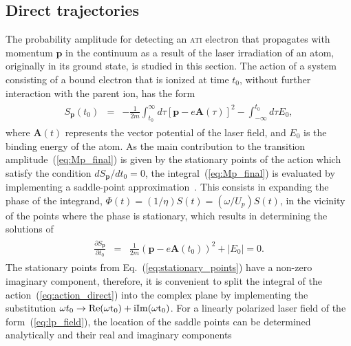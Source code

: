 
\subsection{\label{sec:spa_direct} Direct trajectories}

The probability amplitude for detecting an \textsc{ati} electron that
propagates with momentum $\mathbf{p}$ in the continuum as a result of
the laser irradiation of an atom, originally in its ground state, is
studied in this section. The action of a system consisting of a bound
electron that is ionized at time $t_{0}$, without further interaction
with the parent ion, has the form~\cite{phd_Kopold,Becker_ati2002}
%
\begin{eqnarray}
  \label{eq:action_direct}
  \begin{split}
  S_{\mathbf{p}}(t_{0}) & = &
-\frac{1}{2m}\int_{t_{0}}^{\infty}{d\tau [\mathbf{p} - e\mathbf{A}(\tau)]^{2}}
- \int_{-\infty}^{t_{0}}{d\tau E_{0}},
\end{split}
\end{eqnarray}
%
where $\mathbf{A}(t)$ represents the vector potential of the laser
field, and $E_{0}$ is the binding energy of the atom. As the main
contribution to the transition amplitude~(\ref{eq:Mp_final}) is given
by the stationary points of the action which satisfy the condition
$dS_{\mathbf{p}} / dt_{0} = 0$, the integral~(\ref{eq:Mp_final}) is
evaluated by implementing a saddle-point
approximation~\cite{spa_1960}. This consists in expanding the phase of
the integrand, $\Phi(t) = (1/\eta) S(t) = (\omega / U_{p}) S(t)$, in
the vicinity of the points where the phase is stationary, which
results in determining the solutions of
%
\begin{eqnarray}
  \label{eq:stationary_points}
  \begin{split}
    \frac{\partial S_{\mathbf{p}}}{\partial t_{0}} & = &
    \frac{1}{2m} (\mathbf{p} - e\mathbf{A}(t_{0}))^{2} + |E_{0}| = 0.
  \end{split}
\end{eqnarray}
%
The stationary points from Eq.~(\ref{eq:stationary_points}) have a
non-zero imaginary component, therefore, it is convenient to split the
integral of the action~(\ref{eq:action_direct}) into the complex plane
by implementing the substitution $\omega t_{0} \to \rm{Re}(\omega
t_{0}) + i\rm{Im}(\omega t_{0})$. For a linearly polarized laser field
of the form~(\ref{eq:lp_field}), the location of the saddle points can
be determined analytically and their real and imaginary components
